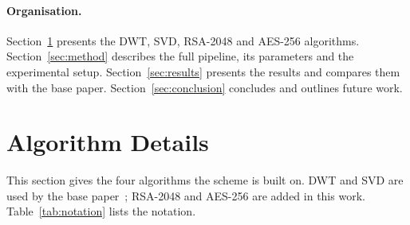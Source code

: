 \documentclass[11pt,a4paper]{article}
\begin{document}
\paragraph{Organisation.} Section~\ref{sec:alg} presents the DWT, SVD, RSA-2048 and AES-256 algorithms. Section~\ref{sec:method} describes the full pipeline, its parameters and the experimental setup. Section~\ref{sec:results} presents the results and compares them with the base paper. Section~\ref{sec:conclusion} concludes and outlines future work.

\section{Algorithm Details}\label{sec:alg}

This section gives the four algorithms the scheme is built on. DWT and SVD are used by the base paper~\cite{sanivarapu2022}; RSA-2048 and AES-256 are added in this work. Table~\ref{tab:notation} lists the notation.
\end{document}
